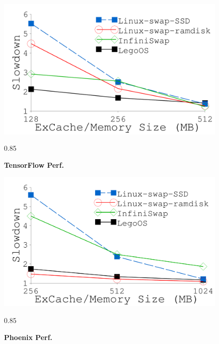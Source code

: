 \documentclass[10pt,times,twocolumn]{z2-article}
\renewcommand{\em}{\it}
\newcommand{\beforecaption}{\vspace{-.15cm}\begin{spacing}{0.85}}
\newcommand{\aftercaption}{\vspace{-.45cm}\end{spacing}}
\newcommand{\mycaption}[3]{\beforecaption\caption{\label{#1}{\bf\footnotesize #2} \em\scriptsize #3}\aftercaption}
\providecommand{\DIFaddbegin}{} %
\newcommand{\DIFaddincludegraphics}[2][]{{\color{blue}\fbox{\DIFOincludegraphics[#1]{#2}}}} %
\DeclareRobustCommand{\DIFaddbegin}{\DIFOaddbegin \let\includegraphics\DIFaddincludegraphics} %
\begin{document}
{{{{{{{\DIFaddbegin {
\begin{figure}[th]
\begin{minipage}{0.50\columnwidth}
\begin{center}
\centerline{\includegraphics[width=1.0\columnwidth]{Figures/g_plot_LEGO_tf4.pdf}}
\vspace{-0.1in}
\mycaption{fig-tf4}{TensorFlow Perf.}
{
}
\end{center}
\end{minipage}
\begin{minipage}{0.50\columnwidth}
\begin{center}
\centerline{\includegraphics[width=1.0\columnwidth]{Figures/g_plot_LEGO_phoenix.pdf}}
\vspace{-0.1in}
\mycaption{fig-phoenix}{Phoenix Perf.}
{
}
\end{center}
\end{minipage}
\end{figure}}}}}}}}}
\end{document}
